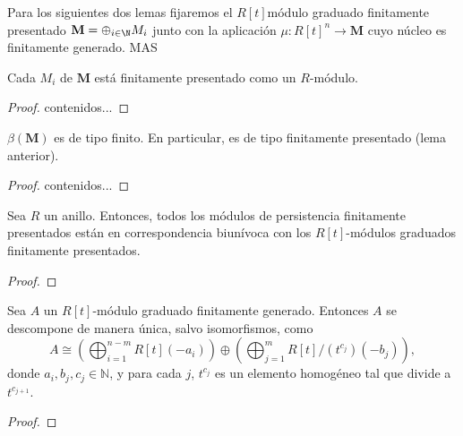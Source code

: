 Para los siguientes dos lemas fijaremos el \(R[t]\)módulo graduado finitamente presentado \(\mathbf{M} = \oplus_{i \in \N} M_i\) junto con la aplicación \(\mu : R[t]^n \to \mathbf{M}\) cuyo núcleo es finitamente generado. MAS

\begin{lema}
	Cada \(M_i\) de \(\mathbf{M}\) está finitamente presentado como un \(R\)-módulo.
\end{lema}
\begin{proof}
	contenidos...
\end{proof}

\begin{lema}
	\(\beta(\mathbf{M})\) es de tipo finito. En particular, es de tipo finitamente presentado (lema anterior).
\end{lema}
\begin{proof}
	contenidos...
\end{proof}

\begin{teorema}
	Sea \( R \) un anillo. Entonces, todos los módulos de persistencia finitamente presentados están en correspondencia biunívoca con los \( R[t] \)-módulos graduados finitamente presentados.
\end{teorema}

\begin{proof}
\end{proof}

\begin{teorema}
	Sea \( A \) un \( R[t] \)-módulo graduado finitamente generado. Entonces \( A \) se descompone de manera única, salvo isomorfismos, como
	\[
	A \cong \left( \bigoplus_{i=1}^{n-m} R[t](-a_i) \right) \oplus \left( \bigoplus_{j=1}^{m} R[t]/(t^{c_j})(-b_j) \right),
	\]
	donde \( a_i, b_j, c_j \in \mathbb{N} \), y para cada \( j \), \( t^{c_j} \) es un elemento homogéneo tal que divide a \( t^{c_{j+1}} \).
\end{teorema}

\begin{proof}
\end{proof}

\endinput
